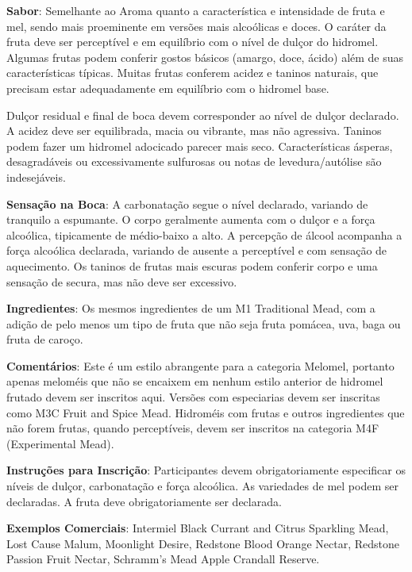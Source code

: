 \textbf{Sabor}: Semelhante ao Aroma quanto a característica e intensidade de fruta e mel, sendo mais proeminente em versões mais alcoólicas e doces. O caráter da fruta deve ser perceptível e em equilíbrio com o nível de dulçor do hidromel. Algumas frutas podem conferir gostos básicos (amargo, doce, ácido) além de suas características típicas. Muitas frutas conferem acidez e taninos naturais, que precisam estar adequadamente em equilíbrio com o hidromel base.

Dulçor residual e final de boca devem corresponder ao nível de dulçor declarado. A acidez deve ser equilibrada, macia ou vibrante, mas não agressiva. Taninos podem fazer um hidromel adocicado parecer mais seco. Características ásperas, desagradáveis ou excessivamente sulfurosas ou notas de levedura/autólise são indesejáveis.

\textbf{Sensação na Boca}: A carbonatação segue o nível declarado, variando de tranquilo a espumante. O corpo geralmente aumenta com o dulçor e a força alcoólica, tipicamente de médio-baixo a alto. A percepção de álcool acompanha a força alcoólica declarada, variando de ausente a perceptível e com sensação de aquecimento. Os taninos de frutas mais escuras podem conferir corpo e uma sensação de secura, mas não deve ser excessivo.

\textbf{Ingredientes}: Os mesmos ingredientes de um M1 Traditional Mead, com a adição de pelo menos um tipo de fruta que não seja fruta pomácea, uva, baga ou fruta de caroço.

\textbf{Comentários}: Este é um estilo abrangente para a categoria Melomel, portanto apenas meloméis que não se encaixem em nenhum estilo anterior de hidromel frutado devem ser inscritos aqui. Versões com especiarias devem ser inscritas como M3C Fruit and Spice Mead. Hidroméis com frutas e outros ingredientes que não forem frutas, quando perceptíveis, devem ser inscritos na categoria M4F (Experimental Mead).

\textbf{Instruções para Inscrição}: Participantes devem obrigatoriamente especificar os níveis de dulçor, carbonatação e força alcoólica. As variedades de mel podem ser declaradas. A fruta deve obrigatoriamente ser declarada.

\textbf{Exemplos Comerciais}: Intermiel Black Currant and Citrus Sparkling Mead, Lost Cause Malum, Moonlight Desire, Redstone Blood Orange Nectar, Redstone Passion Fruit Nectar, Schramm's Mead Apple Crandall Reserve.
